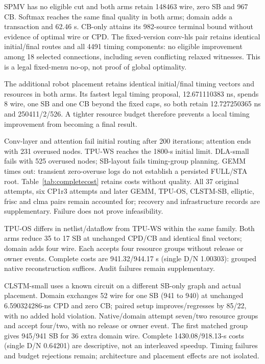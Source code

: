 \documentclass[conference,10pt]{IEEEtran}
\begin{document}
SPMV has no eligible cut and both arms retain 148463 wire, zero SB and 967 CB. Softmax reaches the same final quality in both arms; domain adds a transaction and 62.46 s. CB-only attains its 982-source terminal bound without evidence of optimal wire or CPD. The fixed-version conv-hls pair retains identical initial/final routes and all 4491 timing components: no eligible improvement among 18 selected connections, including seven conflicting relaxed witnesses. This is a legal fixed-menu no-op, not proof of global optimality.

The additional robot placement retains identical initial/final timing vectors and resources in both arms. Its fastest legal timing proposal, 12.671110383 ns, spends 8 wire, one SB and one CB beyond the fixed caps, so both retain 12.727250365 ns and 250411/2/526. A tighter resource budget therefore prevents a local timing improvement from becoming a final result.

Conv-layer and attention fail initial routing after 200 iterations; attention ends with 231 overused nodes. TPU-WS reaches the 1800-s initial limit. DLA-small fails with 525 overused nodes; SB-layout fails timing-group planning. GEMM times out: transient zero-overuse logs do not establish a persisted FULL/STA root. Table~\ref{tab:completecost} retains costs without quality. All 37 original attempts, six CP1r3 attempts and later GEMM, TPU-OS, CLSTM-SB, elliptic, frisc and clma pairs remain accounted for; recovery and infrastructure records are supplementary. Failure does not prove infeasibility.

TPU-OS differs in netlist/dataflow from TPU-WS within the same family. Both arms reduce 35 to 17 SB at unchanged CPD/CB and identical final vectors; domain adds four wire. Each accepts four resource groups without release or owner events. Complete costs are 941.32/944.17 s (single D/N 1.00303): grouped native reconstruction suffices. Audit failures remain supplementary.

CLSTM-small uses a known circuit on a different SB-only graph and actual placement. Domain exchanges 52 wire for one SB (941 to 940) at unchanged 6.590324286-ns CPD and zero CB; paired setup improves/regresses by 85/22, with no added hold violation. Native/domain attempt seven/two resource groups and accept four/two, with no release or owner event. The first matched group gives 945/941 SB for 36 extra domain wire. Complete 1430.08/918.13-s costs (single D/N 0.64201) are descriptive, not an interleaved speedup. Timing failures and budget rejections remain; architecture and placement effects are not isolated.
\end{document}

